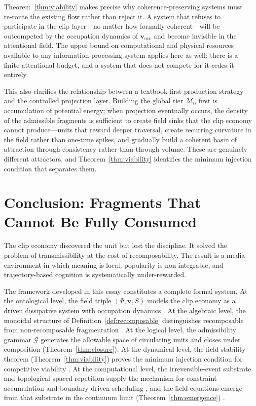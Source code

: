 \documentclass{amsart}
\theoremstyle{plain}
\theoremstyle{definition}
\theoremstyle{remark}
\newcommand{\scalar}{\Phi}
\newcommand{\vfield}{\mathbf{v}}
\newcommand{\entr}{S}
\newcommand{\vocc}{\mathbf{v}_{\!\text{occ}}}
\newcommand{\Man}{\mathcal{M}}
\begin{document}
Theorem~\ref{thm:viability} makes precise why coherence-preserving systems must
re-route the existing flow rather than reject it.  A system that refuses to
participate in the clip layer---no matter how formally coherent---will be outcompeted
by the occupation dynamics of $\vocc$ and become invisible in the attentional
field.  The upper bound on computational and physical resources available to any
information-processing system \cite{lloyd2000} applies here as well: there is a
finite attentional budget, and a system that does not compete for it cedes it
entirely.

This also clarifies the relationship between a textbook-first production strategy
and the controlled projection layer.  Building the global tier $\Man_0$ first is
accumulation of potential energy; when projection eventually occurs, the density of
the admissible fragments is sufficient to create field sinks that the clip economy
cannot produce---units that reward deeper traversal, create recurring curvature in
the field rather than one-time spikes, and gradually build a coherent basin of
attraction through consistency rather than through volume.  These are genuinely
different attractors, and Theorem~\ref{thm:viability} identifies the minimum
injection condition that separates them.

\section{Conclusion: Fragments That Cannot Be Fully Consumed}
\label{sec:conclusion}

The clip economy discovered the unit but lost the discipline.  It solved the
problem of transmissibility at the cost of recomposability.  The result is a media
environment in which meaning is local, popularity is non-integrable, and
trajectory-based cognition is systematically under-rewarded.

The framework developed in this essay constitutes a complete formal system.  At
the ontological level, the field triple $(\scalar, \vfield, \entr)$ models the
clip economy as a driven dissipative system with occupation dynamics
\cite{cross1993,prigogine1984}.  At the algebraic level, the monoidal structure of
Definition~\ref{def:recomposable} distinguishes recomposable from non-recomposable
fragmentation \cite{maclane1998,baez2011}.  At the logical level, the admissibility
grammar $\mathcal{G}$ generates the allowable space of circulating units and closes
under composition (Theorem~\ref{thm:closure}).  At the dynamical level, the field
stability theorem (Theorem~\ref{thm:viability}) proves the minimum injection
condition for competitive viability \cite{strogatz2018}.  At the computational
level, the irreversible-event substrate and topological spaced repetition supply
the mechanism for constraint accumulation and boundary-driven scheduling
\cite{bennett1982,lloyd2000}, and the field equations emerge from that substrate in
the continuum limit (Theorem~\ref{thm:emergence}) \cite{anderson1972,cross1993}.
\end{document}
